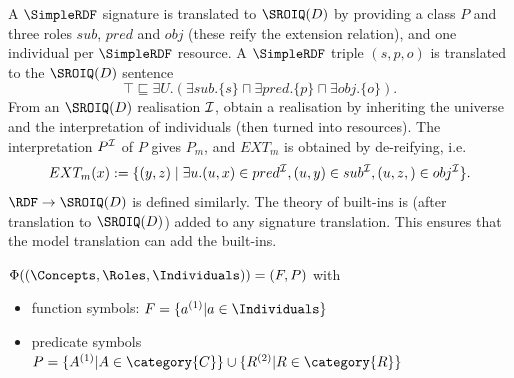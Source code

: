 \documentclass[10pt, a4paper]{isov2}
\begin{document}
A $\SimpleRDF$ signature is translated to $\SROIQ(D)$ by providing a class
$P$ and three roles $sub$, $pred$ and $obj$ (these reify the extension
relation), and one individual per $\SimpleRDF$ resource. A $\SimpleRDF$ triple
$(s,p,o)$ is translated to the $\SROIQ(D)$ sentence
   $$\top \sqsubseteq \exists U. (\exists sub. \{s\} \sqcap \exists pred. \{p\} \sqcap  \exists obj. \{o\} ).$$
  From an $\SROIQ(D)$ realisation ${\cal I}$, obtain a \SimpleRDF realisation by inheriting the universe
  and the interpretation of individuals (then turned into resources).
  The interpretation $P^{\cal I}$ of $P$ gives $P_m$, and $EXT_m$ is obtained
  by de-reifying,
 i.e.\ $$EXT_{m}(x):=\{(y,z) \mid \exists u . (u,x)\in pred^{\cal I},
  (u,y)\in sub^{\cal I}, (u,z,)\in obj^{\cal I} \}.$$
  $\RDF \rightarrow \SROIQ(D)$ is defined similarly. The theory of \RDF built-ins 
  is (after translation to $\SROIQ(D)$) added to any signature translation.
  This ensures that the model translation can add the built-ins.





 $\Phi((\Concepts, \Roles, \Individuals)) =  (F, P)$ with
\begin{itemize}
	\item function symbols: $F = \{a^{(1)} \vert a \in \Individuals\}$
	\item predicate symbols $P = \{A^{(1)} \vert A \in \category{C} \} \cup \{ R^{(2)} \vert R \in \category{R}\}$
\end{itemize}


\end{document}
